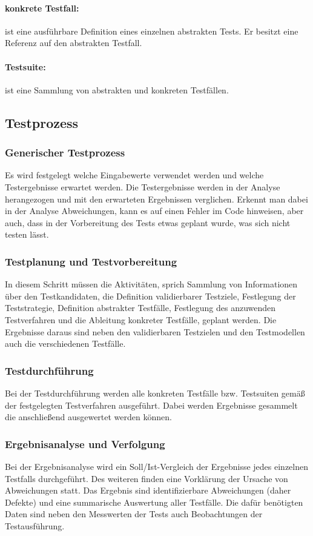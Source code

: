 \paragraph{konkrete Testfall:} ist eine ausführbare Definition eines einzelnen abstrakten Tests. Er besitzt eine Referenz auf den abstrakten Testfall.
\paragraph{Testsuite:} ist eine Sammlung von abstrakten und konkreten Testfällen.

\subsection{Testprozess}
\subsubsection{Generischer Testprozess}
Es wird festgelegt welche Eingabewerte verwendet werden und welche Testergebnisse erwartet werden. Die Testergebnisse werden in der Analyse herangezogen und mit den erwarteten Ergebnissen verglichen. Erkennt man dabei in der Analyse Abweichungen, kann es auf einen Fehler im Code hinweisen, aber auch, dass in der Vorbereitung des Tests etwas geplant wurde, was sich nicht testen lässt. 

\subsubsection{Testplanung und Testvorbereitung}
In diesem Schritt müssen die Aktivitäten, sprich Sammlung von Informationen über den Testkandidaten, die Definition validierbarer Testziele, Festlegung der Teststrategie, Definition abstrakter Testfälle, Festlegung des anzuwenden Testverfahren und die Ableitung konkreter Testfälle, geplant werden.
Die Ergebnisse daraus sind neben den validierbaren Testzielen und den Testmodellen auch die verschiedenen Testfälle.

\subsubsection{Testdurchführung}
Bei der Testdurchführung werden alle konkreten Testfälle bzw. Testsuiten gemäß der festgelegten Testverfahren ausgeführt. Dabei werden Ergebnisse gesammelt die anschließend ausgewertet werden können.

\subsubsection{Ergebnisanalyse und Verfolgung}
Bei der Ergebnisanalyse wird ein Soll/Ist-Vergleich der Ergebnisse jedes einzelnen Testfalls durchgeführt. Des weiteren finden eine Vorklärung der Ursache von Abweichungen statt. Das Ergebnis sind identifizierbare Abweichungen (daher Defekte) und eine summarische Auswertung aller Testfälle.
Die dafür benötigten Daten sind neben den Messwerten der Tests auch Beobachtungen der Testausführung.

